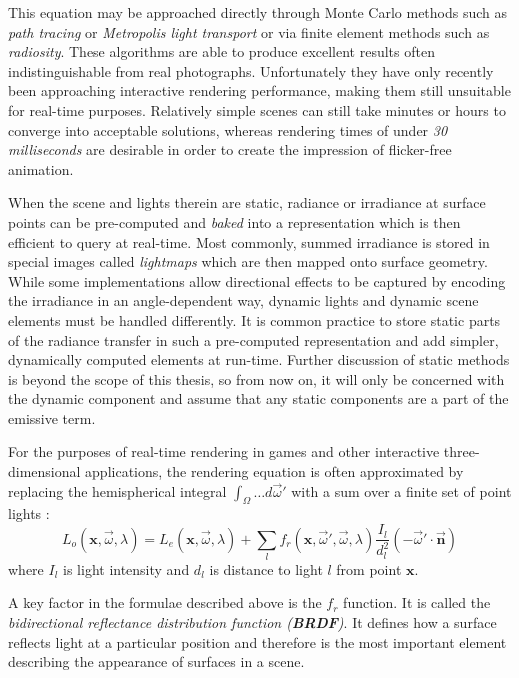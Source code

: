 This equation may be approached directly through Monte Carlo methods such as \emph{path tracing} or \emph{Metropolis light transport} or via finite element methods such as \emph{radiosity}. These algorithms are able to produce excellent results often indistinguishable from real photographs. Unfortunately they have only recently been approaching interactive rendering performance, making them still unsuitable for real-time purposes. Relatively simple scenes can still take minutes or hours to converge into acceptable solutions, whereas rendering times of under \emph{30 milliseconds} are desirable in order to create the impression of flicker-free animation.

When the scene and lights therein are static, radiance or irradiance at surface points can be pre-computed and \emph{baked} into a representation which is then efficient to query at real-time. Most commonly, summed irradiance is stored in special images called \emph{lightmaps} which are then mapped onto surface geometry. While some implementations \cite{Chen08Halo3} allow directional effects to be captured by encoding the irradiance in an angle-dependent way, dynamic lights and dynamic scene elements must be handled differently. It is common practice to store static parts of the radiance transfer in such a pre-computed representation and add simpler, dynamically computed elements at run-time. Further discussion of static methods is beyond the scope of this thesis, so from now on, it will only be concerned with the dynamic component and assume that any static components are a part of the emissive term.

For the purposes of real-time rendering in games and other interactive three-dimensional applications, the rendering equation is often approximated by replacing the hemispherical integral $\int_\Omega \ldots d \overrightarrow{\omega}'$ with a sum over a finite set of point lights \cite{Naty06Reflectance}:
\[
L_o(\mathbf x, \overrightarrow{\omega}, \lambda) = L_e(\mathbf x, \overrightarrow{\omega}, \lambda) + \sum_l f_r(\mathbf x, \overrightarrow{\omega}', \overrightarrow{\omega}, \lambda) \frac{I_l}{d_l^2} (-\overrightarrow{\omega}' \cdot \overrightarrow{\mathbf n})
\]
where $I_l$ is light intensity and $d_l$ is distance to light $l$ from point $\mathbf x$.

A key factor in the formulae described above is the $f_r$ function. It is called the \emph{bidirectional reflectance distribution function (\textbf{BRDF})}. It defines how a surface reflects light at a particular position and therefore is the most important element describing the appearance of surfaces in a scene.

